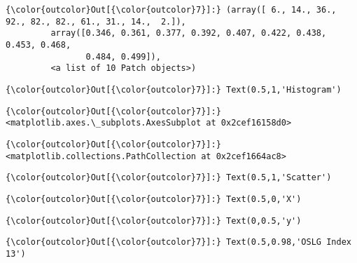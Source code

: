 \documentclass[11pt]{article}
\begin{document}
\begin{Verbatim}[commandchars=\\\{\}]
{\color{outcolor}Out[{\color{outcolor}7}]:} (array([ 6., 14., 36., 92., 82., 82., 61., 31., 14.,  2.]),
         array([0.346, 0.361, 0.377, 0.392, 0.407, 0.422, 0.438, 0.453, 0.468,
                0.484, 0.499]),
         <a list of 10 Patch objects>)
\end{Verbatim}
            
\begin{Verbatim}[commandchars=\\\{\}]
{\color{outcolor}Out[{\color{outcolor}7}]:} Text(0.5,1,'Histogram')
\end{Verbatim}
            
\begin{Verbatim}[commandchars=\\\{\}]
{\color{outcolor}Out[{\color{outcolor}7}]:} <matplotlib.axes.\_subplots.AxesSubplot at 0x2cef16158d0>
\end{Verbatim}
            
\begin{Verbatim}[commandchars=\\\{\}]
{\color{outcolor}Out[{\color{outcolor}7}]:} <matplotlib.collections.PathCollection at 0x2cef1664ac8>
\end{Verbatim}
            
\begin{Verbatim}[commandchars=\\\{\}]
{\color{outcolor}Out[{\color{outcolor}7}]:} Text(0.5,1,'Scatter')
\end{Verbatim}
            
\begin{Verbatim}[commandchars=\\\{\}]
{\color{outcolor}Out[{\color{outcolor}7}]:} Text(0.5,0,'X')
\end{Verbatim}
            
\begin{Verbatim}[commandchars=\\\{\}]
{\color{outcolor}Out[{\color{outcolor}7}]:} Text(0,0.5,'y')
\end{Verbatim}
            
\begin{Verbatim}[commandchars=\\\{\}]
{\color{outcolor}Out[{\color{outcolor}7}]:} Text(0.5,0.98,'OSLG Index 13')
\end{Verbatim}
            
    \begin{center}
    \end{center}
    { \hspace*{\fill} \\}
    
\end{document}
